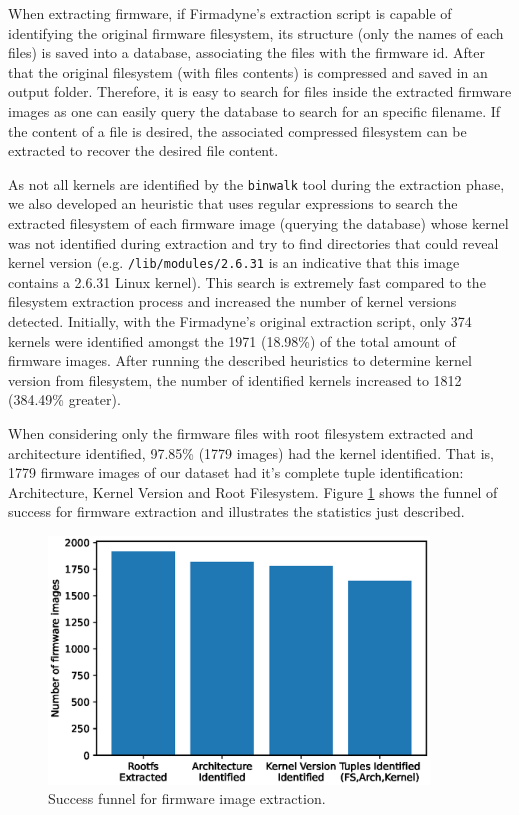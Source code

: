 When extracting firmware, if Firmadyne's extraction script is capable of identifying the original firmware filesystem, its structure (only the names of each files) is saved into a database, associating the files with the firmware id. After that the original filesystem (with files contents) is compressed and saved in an output folder. Therefore, it is easy to search for files inside the extracted firmware images as one can easily query the database to search for an specific filename. If the content of a file is desired, the associated compressed filesystem can be extracted to recover the desired file content.

As not all kernels are identified by the {\tt binwalk} tool during the extraction phase, we also developed an heuristic that uses regular expressions to search the extracted filesystem of each firmware image (querying the database) whose kernel was not identified during extraction and try to find directories that could reveal kernel version (e.g. {\tt /lib/modules/2.6.31} is an indicative that this image contains a 2.6.31 Linux kernel). This search is extremely fast compared to the filesystem extraction process and increased the number of kernel versions detected. Initially, with the Firmadyne's \cite{firmadyne} original extraction script, only 374 kernels were identified amongst the 1971 (18.98\%) of the total amount of firmware images. After running the described heuristics to determine kernel version from filesystem, the number of identified kernels increased to 1812 (384.49\% greater).

When considering only the firmware files with root filesystem extracted and architecture identified, 97.85\% (1779 images) had the kernel identified. That is, 1779 firmware images of our dataset had it's complete tuple identification: Architecture, Kernel Version and Root Filesystem. Figure \ref{fig:stats-funnel} shows the funnel of success for firmware extraction and illustrates the statistics just described.

\begin{figure}[H]
    \centering
    \includegraphics[width=0.90\textwidth]{figs/extraction_funnel.eps}
    \caption{Success funnel for firmware image extraction.}
    \label{fig:stats-funnel}
\end{figure}


